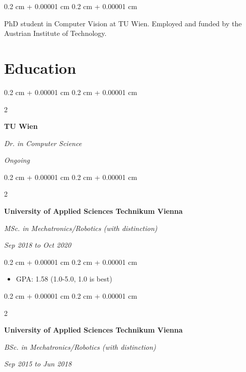 \documentclass[10pt, letterpaper]{article}
\newenvironment{highlights}{
    \begin{itemize}[
        topsep=0.10 cm,
        parsep=0.10 cm,
        partopsep=0pt,
        itemsep=0pt,
        leftmargin=0.4 cm + 10pt
    ]
}{
    \end{itemize}
} %
\newenvironment{onecolentry}{
    \begin{adjustwidth}{
        0.2 cm + 0.00001 cm
    }{
        0.2 cm + 0.00001 cm
    }
}{
    \end{adjustwidth}
} %
\newenvironment{twocolentry}[2][]{
    \onecolentry
    \def\secondColumn{#2}
    \setcolumnwidth{\fill, 4.5 cm}
    \begin{paracol}{2}
}{
    \switchcolumn \raggedleft \secondColumn
    \end{paracol}
    \endonecolentry
} %
\begin{document}
        
        \begin{onecolentry}
            PhD student in Computer Vision at TU Wien. Employed and funded by the Austrian Institute of Technology.
        \end{onecolentry}


    
    \section{Education}



        
        \begin{twocolentry}{
            
            
        \textit{Ongoing}}
            \textbf{TU Wien}

            \textit{Dr. in Computer Science}
        \end{twocolentry}



        \vspace{0.2 cm}

        \begin{twocolentry}{
            
            
        \textit{Sep 2018 to Oct 2020}}
            \textbf{University of Applied Sciences Technikum Vienna}

            \textit{MSc. in Mechatronics/Robotics (with distinction)}
        \end{twocolentry}

        \vspace{0.10 cm}
        \begin{onecolentry}
            \begin{highlights}
                \item GPA: 1.58 (1.0-5.0, 1.0 is best)
            \end{highlights}
        \end{onecolentry}


        \vspace{0.2 cm}

        \begin{twocolentry}{
            
            
        \textit{Sep 2015 to Jun 2018}}
            \textbf{University of Applied Sciences Technikum Vienna}

            \textit{BSc. in Mechatronics/Robotics (with distinction)}
        \end{twocolentry}
\end{document}
